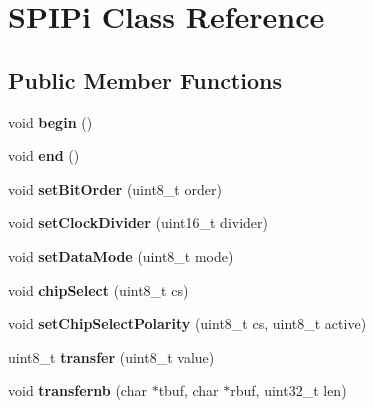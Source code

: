 \hypertarget{class_s_p_i_pi}{}\section{S\+P\+I\+Pi Class Reference}
\label{class_s_p_i_pi}
\subsection*{Public Member Functions}
\begin{DoxyCompactItemize}
\item 
\hypertarget{class_s_p_i_pi_a6274df6d961da1e9d1433fa74c1d18e7}{}void {\bfseries begin} ()\label{class_s_p_i_pi_a6274df6d961da1e9d1433fa74c1d18e7}

\item 
\hypertarget{class_s_p_i_pi_a574b24be86536b0baf439fc0ef81eb90}{}void {\bfseries end} ()\label{class_s_p_i_pi_a574b24be86536b0baf439fc0ef81eb90}

\item 
\hypertarget{class_s_p_i_pi_ad1d918e5206aabf6682fbd17800347d1}{}void {\bfseries set\+Bit\+Order} (uint8\+\_\+t order)\label{class_s_p_i_pi_ad1d918e5206aabf6682fbd17800347d1}

\item 
\hypertarget{class_s_p_i_pi_a9a82e13fc6a4b0965b79476dc593cc8d}{}void {\bfseries set\+Clock\+Divider} (uint16\+\_\+t divider)\label{class_s_p_i_pi_a9a82e13fc6a4b0965b79476dc593cc8d}

\item 
\hypertarget{class_s_p_i_pi_a5b8f65d9fbf0655a6880caa116b22d6d}{}void {\bfseries set\+Data\+Mode} (uint8\+\_\+t mode)\label{class_s_p_i_pi_a5b8f65d9fbf0655a6880caa116b22d6d}

\item 
\hypertarget{class_s_p_i_pi_a4495da2c13b687ce3ccfeff517801649}{}void {\bfseries chip\+Select} (uint8\+\_\+t cs)\label{class_s_p_i_pi_a4495da2c13b687ce3ccfeff517801649}

\item 
\hypertarget{class_s_p_i_pi_a49852821239783aad30b20a59afc4309}{}void {\bfseries set\+Chip\+Select\+Polarity} (uint8\+\_\+t cs, uint8\+\_\+t active)\label{class_s_p_i_pi_a49852821239783aad30b20a59afc4309}

\item 
\hypertarget{class_s_p_i_pi_aee0e105e2bf4a7da232715eb9fa9515a}{}uint8\+\_\+t {\bfseries transfer} (uint8\+\_\+t value)\label{class_s_p_i_pi_aee0e105e2bf4a7da232715eb9fa9515a}

\item 
\hypertarget{class_s_p_i_pi_a344b536545e24ac029e5bf347e2b8d2c}{}void {\bfseries transfernb} (char $\ast$tbuf, char $\ast$rbuf, uint32\+\_\+t len)\label{class_s_p_i_pi_a344b536545e24ac029e5bf347e2b8d2c}

\end{DoxyCompactItemize}


